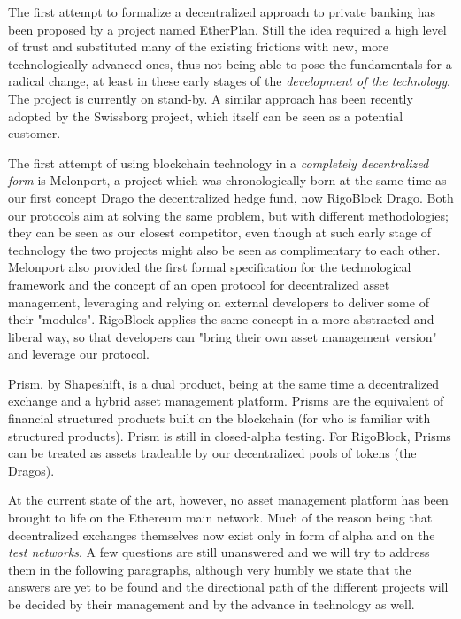 \documentclass[9pt,oneside]{amsart}
\begin{document}
\begin{multicols}{2}
The first attempt to formalize a decentralized approach to private banking has been proposed by a project named EtherPlan. Still the idea required a high level of trust and substituted many of the existing frictions with new, more technologically advanced ones, thus not being able to pose the fundamentals for a radical change, at least in these early stages of the \textit{development of the technology}. The project is currently on stand-by. A similar approach has been recently adopted by the Swissborg project, which itself can be seen as a potential customer.

The first attempt of using blockchain technology in a \textit{completely decentralized form} is Melonport, a project which was chronologically born at the same time as our first concept Drago the decentralized hedge fund, now RigoBlock Drago. Both our protocols aim at solving the same problem, but with different methodologies; they can be seen as our closest competitor, even though at such early stage of technology the two projects might also be seen as complimentary to each other. Melonport also provided the first formal specification for the technological framework and the concept of an open protocol for decentralized asset management, leveraging and relying on external developers to deliver some of their "modules". RigoBlock applies the same concept in a more abstracted and liberal way, so that developers can "bring their own asset management version" and leverage our protocol.

Prism, by Shapeshift, is a dual product, being at the same time a decentralized exchange and a hybrid asset management platform. Prisms are the equivalent of financial structured products built on the blockchain (for who is familiar with structured products). Prism is still in closed-alpha testing. For RigoBlock, Prisms can be treated as assets tradeable by our decentralized pools of tokens (the Dragos).

At the current state of the art, however, no asset management platform has been brought to life on the Ethereum main network. Much of the reason being that decentralized exchanges themselves now exist only in form of alpha and on the \textit{test networks}. A few questions are still unanswered and we will try to address them in the following paragraphs, although very humbly we state that the answers are yet to be found and the directional path of the different projects will be decided by their management and by the advance in technology as well.



\end{multicols}
\end{document}
